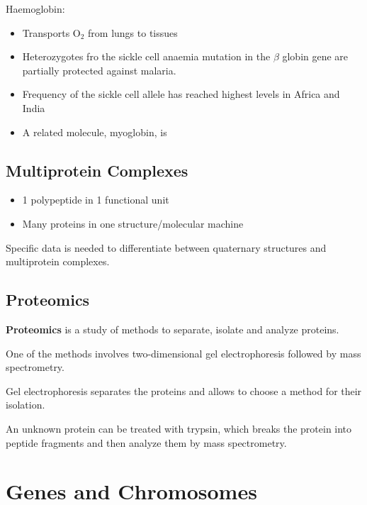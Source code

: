 \documentclass[11pt]{scrartcl}
\begin{document}
Haemoglobin:

\begin{itemize}
\item Transports O$_{2}$ from lungs to tissues

\item Heterozygotes fro the sickle cell anaemia mutation in the
  $\beta$ globin gene are partially protected against malaria.
\item Frequency of the sickle cell allele has reached highest levels in Africa and India

\item A related molecule, myoglobin, is
\end{itemize}

\subsection{Multiprotein Complexes}
\begin{itemize}
\item 1 polypeptide in 1 functional unit
\item Many proteins in one structure/molecular machine
\end{itemize}

Specific data is needed to differentiate between quaternary structures
and multiprotein complexes.

\subsection{Proteomics}

\begin{definition}
  \textbf{Proteomics } is a study of methods to separate, isolate and analyze proteins.

\end{definition}

One of the methods involves two-dimensional gel electrophoresis
followed by mass spectrometry.

Gel electrophoresis separates the proteins and allows to choose a
method for their isolation.

An unknown protein can be treated with trypsin, which breaks the
protein into peptide fragments and then analyze them by mass
spectrometry.

\section{Genes and Chromosomes}
\end{document}
